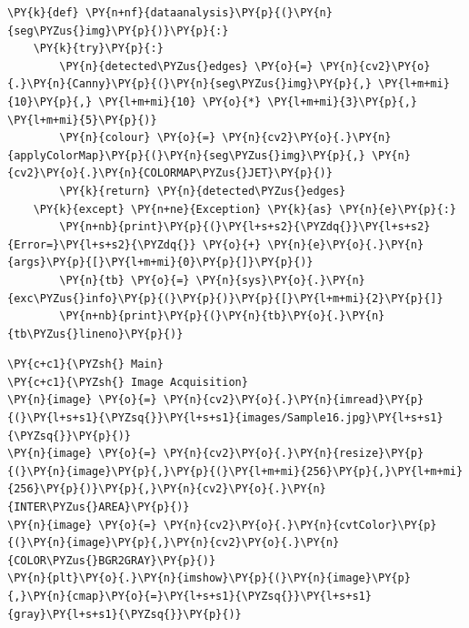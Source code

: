 \begin{tcolorbox}[breakable, size=fbox, boxrule=1pt, pad at break*=1mm,colback=cellbackground, colframe=cellborder]
	\begin{Verbatim}[commandchars=\\\{\}]
\PY{k}{def} \PY{n+nf}{dataanalysis}\PY{p}{(}\PY{n}{seg\PYZus{}img}\PY{p}{)}\PY{p}{:}
    \PY{k}{try}\PY{p}{:}
        \PY{n}{detected\PYZus{}edges} \PY{o}{=} \PY{n}{cv2}\PY{o}{.}\PY{n}{Canny}\PY{p}{(}\PY{n}{seg\PYZus{}img}\PY{p}{,} \PY{l+m+mi}{10}\PY{p}{,} \PY{l+m+mi}{10} \PY{o}{*} \PY{l+m+mi}{3}\PY{p}{,} \PY{l+m+mi}{5}\PY{p}{)}
        \PY{n}{colour} \PY{o}{=} \PY{n}{cv2}\PY{o}{.}\PY{n}{applyColorMap}\PY{p}{(}\PY{n}{seg\PYZus{}img}\PY{p}{,} \PY{n}{cv2}\PY{o}{.}\PY{n}{COLORMAP\PYZus{}JET}\PY{p}{)}
        \PY{k}{return} \PY{n}{detected\PYZus{}edges}
    \PY{k}{except} \PY{n+ne}{Exception} \PY{k}{as} \PY{n}{e}\PY{p}{:}
        \PY{n+nb}{print}\PY{p}{(}\PY{l+s+s2}{\PYZdq{}}\PY{l+s+s2}{Error=}\PY{l+s+s2}{\PYZdq{}} \PY{o}{+} \PY{n}{e}\PY{o}{.}\PY{n}{args}\PY{p}{[}\PY{l+m+mi}{0}\PY{p}{]}\PY{p}{)}
        \PY{n}{tb} \PY{o}{=} \PY{n}{sys}\PY{o}{.}\PY{n}{exc\PYZus{}info}\PY{p}{(}\PY{p}{)}\PY{p}{[}\PY{l+m+mi}{2}\PY{p}{]}
        \PY{n+nb}{print}\PY{p}{(}\PY{n}{tb}\PY{o}{.}\PY{n}{tb\PYZus{}lineno}\PY{p}{)}
	\end{Verbatim}
\end{tcolorbox}

\begin{tcolorbox}[breakable, size=fbox, boxrule=1pt, pad at break*=1mm,colback=cellbackground, colframe=cellborder]
	\begin{Verbatim}[commandchars=\\\{\}]
\PY{c+c1}{\PYZsh{} Main}
\PY{c+c1}{\PYZsh{} Image Acquisition}
\PY{n}{image} \PY{o}{=} \PY{n}{cv2}\PY{o}{.}\PY{n}{imread}\PY{p}{(}\PY{l+s+s1}{\PYZsq{}}\PY{l+s+s1}{images/Sample16.jpg}\PY{l+s+s1}{\PYZsq{}}\PY{p}{)}
\PY{n}{image} \PY{o}{=} \PY{n}{cv2}\PY{o}{.}\PY{n}{resize}\PY{p}{(}\PY{n}{image}\PY{p}{,}\PY{p}{(}\PY{l+m+mi}{256}\PY{p}{,}\PY{l+m+mi}{256}\PY{p}{)}\PY{p}{,}\PY{n}{cv2}\PY{o}{.}\PY{n}{INTER\PYZus{}AREA}\PY{p}{)}
\PY{n}{image} \PY{o}{=} \PY{n}{cv2}\PY{o}{.}\PY{n}{cvtColor}\PY{p}{(}\PY{n}{image}\PY{p}{,}\PY{n}{cv2}\PY{o}{.}\PY{n}{COLOR\PYZus{}BGR2GRAY}\PY{p}{)}
\PY{n}{plt}\PY{o}{.}\PY{n}{imshow}\PY{p}{(}\PY{n}{image}\PY{p}{,}\PY{n}{cmap}\PY{o}{=}\PY{l+s+s1}{\PYZsq{}}\PY{l+s+s1}{gray}\PY{l+s+s1}{\PYZsq{}}\PY{p}{)}
	\end{Verbatim}
\end{tcolorbox}

